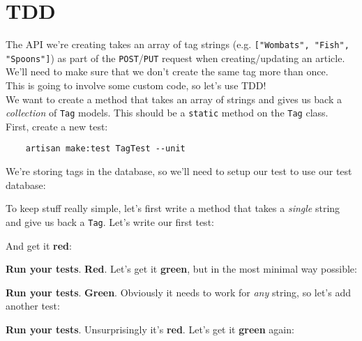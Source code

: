 \section{TDD}

The API we're creating takes an array of tag strings (e.g. \texttt{["Wombats", "Fish", "Spoons"]}) as part of the \texttt{POST}/\texttt{PUT} request when creating/updating an article. We'll need to make sure that we don't create the same tag more than once.
\\

This is going to involve some custom code, so let's use TDD!
\\

We want to create a method that takes an array of strings and gives us back a \textit{collection} of \texttt{Tag} models. This should be a \texttt{static} method on the \texttt{Tag} class.
\\

First, create a new test:

\begin{verbatim}
    artisan make:test TagTest --unit
\end{verbatim}

We're storing tags in the database, so we'll need to setup our test to use our test database:



To keep stuff really simple, let's first write a method that takes a \textit{single} string and give us back a \texttt{Tag}. Let's write our first test:


And get it \textbf{red}:



\textbf{Run your tests}. \textbf{Red}. Let's get it \textbf{green}, but in the most minimal way possible:


\textbf{Run your tests}. \textbf{Green}. Obviously it needs to work for \textit{any} string, so let's add another test:


\textbf{Run your tests}. Unsurprisingly it's \textbf{red}. Let's get it \textbf{green} again:



